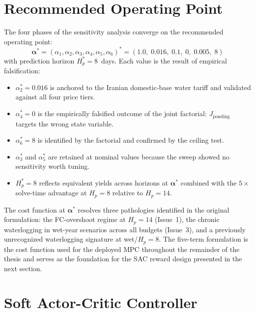 \section{Recommended Operating Point}
\label{sec:ctrl-recommended}

The four phases of the sensitivity analysis converge on the recommended
operating point:
\begin{equation}
\boldsymbol{\alpha}^* = (\alpha_1, \alpha_2, \alpha_3, \alpha_4, \alpha_5,
  \alpha_6)^*
= (1.0,\; 0.016,\; 0.1,\; 0,\; 0.005,\; 8)
\label{eq:alpha-star}
\end{equation}
with prediction horizon $H_p^* = 8$~days. Each value is the result of
empirical falsification:
\begin{itemize}
  \item $\alpha_2^* = 0.016$ is anchored to the Iranian domestic-base water
    tariff and validated against all four price tiers.
  \item $\alpha_4^* = 0$ is the empirically falsified outcome of the joint
    factorial: $J_{\mathrm{ponding}}$ targets the wrong state variable.
  \item $\alpha_6^* = 8$ is identified by the factorial and confirmed by the
    ceiling test.
  \item $\alpha_3^*$ and $\alpha_5^*$ are retained at nominal values
    because the sweep showed no sensitivity worth tuning.
  \item $H_p^* = 8$ reflects equivalent yields across horizons at
    $\boldsymbol{\alpha}^*$ combined with the $5\times$ solve-time advantage
    at $H_p = 8$ relative to $H_p = 14$.
\end{itemize}

The cost function at $\boldsymbol{\alpha}^*$ resolves three pathologies
identified in the original formulation: the FC-overshoot regime at $H_p = 14$
(Issue~1), the chronic waterlogging in wet-year scenarios across all budgets
(Issue~3), and a previously unrecognized waterlogging signature at
wet/$H_p = 8$. The five-term formulation is the cost function used for the
deployed MPC throughout the remainder of the thesis and serves as the
foundation for the SAC reward design presented in the next section.

\section{Soft Actor-Critic Controller}
\label{sec:ctrl-sac}

